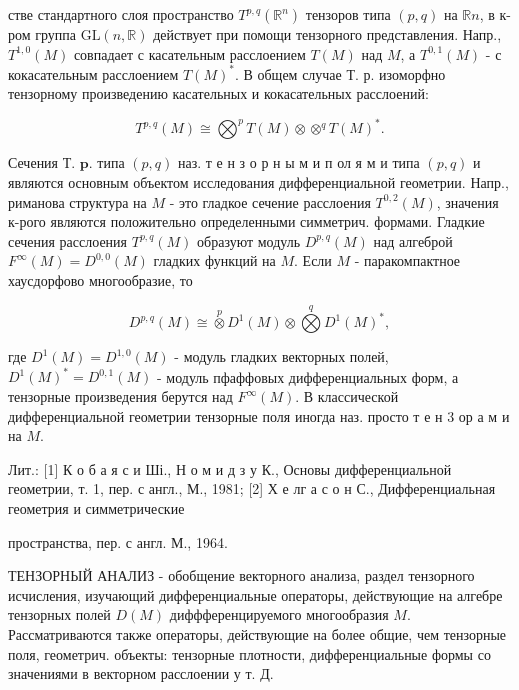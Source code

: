 \documentclass[10pt]{article}
\begin{document}
стве стандартного слоя пространство $T^{p, q}\left(\mathbb{R}^{n}\right)$ тензоров типа $(p, q)$ на $\mathbb{R} n$, в к-ром группа $\mathrm{G} \mathrm{L}(n, \mathbb{R})$ действует при помощи тензорного представления. Напр., $T^{1,0}(M)$ совпадает с касательным расслоением $T(M)$ над $M$, а $T^{0,1}(M)$ - с кокасательным расслоением $T(M)^{*}$. В общем случае Т. р. изоморфно тензорному произведению касательных и кокасательных расслоений:



\[

T^{p, q}(M) \cong \bigotimes^{p} T(M) \otimes \otimes^{q} T(M)^{*} .

\]



Сечения Т. $\mathbf{p}$. типа $(p, q)$ наз. т е н з о р н ы м и п ол я м и типа $(p, q)$ и являются основным объектом исследования дифференциальной геометрии. Напр., риманова структура на $M$ - это гладкое сечение расслоения $T^{0,2}(M)$, значения к-рого являются положительно определенными симметрич. формами. Гладкие сечения расслоения $T^{p, q}(M)$ образуют модуль $D^{p, q}(M)$ над алгеброй $F^{\infty}(M)=D^{0,0}(M)$ гладких функций на $M$. Если $M$ - паракомпактное хаусдорфово многообразие, то



\[

D^{p, q}(M) \cong \stackrel{p}{\otimes} D^{1}(M) \otimes \stackrel{q}{\bigotimes} D^{1}(M)^{*},

\]



где $D^{1}(M)=D^{1,0}(M)$ - модуль гладких векторных полей, $D^{1}(M)^{*}=D^{0,1}(M)$ - модуль пфаффовых дифференциальных форм, а тензорные произведения берутся над $F^{\infty}(M)$. В классической дифференциальной геометрии тензорные поля иногда наз. просто т е н 3 ор а м и на $M$.



Лит.: [1] К о б а я с и Ші., Н о м и д з у К., Основы дифференциальной геометрии, т. 1, пер. с англ., М., 1981; [2] Х е лг а с о н С., Дифференциальная геометрия и симметрические

пространства, пер. с англ. М., 1964.



ТЕНЗОРНЫЙ АНАЛИЗ - обобщение векторного анализа, раздел тензорного исчисления, изучающий дифференциальные операторы, действующие на алгебре тензорных полей $D(M)$ диффференцируемого многообразия $M$. Рассматриваются также операторы, действующие на более общие, чем тензорные поля, геометрич. объекты: тензорные плотности, дифференциальные формы со значениями в векторном расслоении у т. Д.
\end{document}
